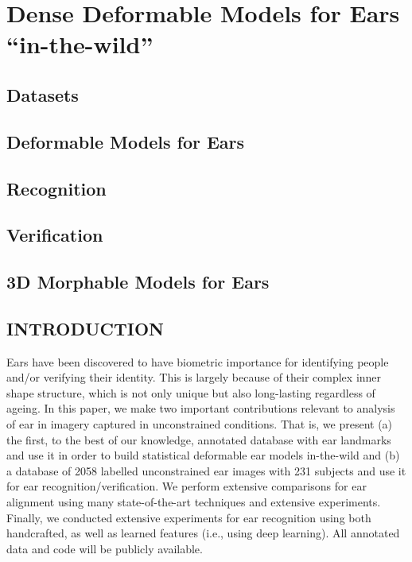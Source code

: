 \chapter{Dense Deformable Models for Ears ``in-the-wild''}

\section{Datasets}

\section{Deformable Models for Ears}

\section{Recognition}

\section{Verification}

\section{3D Morphable Models for Ears}



    
\section{INTRODUCTION}

Ears have been discovered to have  biometric importance for identifying people and/or verifying their identity. This is largely because of their complex inner shape structure, which is not only unique but also long-lasting regardless of ageing. In this paper, we make two important contributions relevant to analysis of ear in imagery captured in unconstrained conditions. That is, we present (a) the first, to the best of our knowledge, annotated database with ear landmarks and use it in order to build statistical deformable ear models in-the-wild and (b) a database of 2058 labelled unconstrained ear images with 231 subjects and use it for ear recognition/verification. We perform extensive comparisons for ear alignment using many state-of-the-art techniques and extensive experiments. Finally, we conducted extensive experiments for ear recognition using both handcrafted, as well as learned features (i.e., using deep learning). All annotated data and code will be publicly available. 


